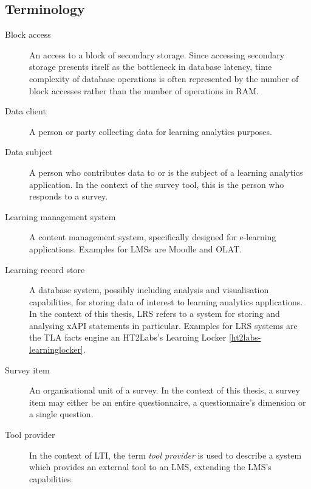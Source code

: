 \subsection{Terminology}
\begin{description}
	\item[Block access] 
		An access to a block of secondary storage. Since accessing secondary storage
		presents itself as the bottleneck in database latency, time complexity of
		database operations is often represented by the number of block accesses rather
		than the number of operations in RAM.
    \item[Data client]
    	A person or party collecting data for learning analytics purposes.
    \item[Data subject]
    	A person who contributes data to or is the subject of a learning analytics 
    	application. In the context of the survey tool, this is the person who
    	responds to a survey.
    \item[Learning management system]
	    A content management system, specifically designed for e-learning applications.
	    Examples for LMSs are Moodle and OLAT.
    \item[Learning record store]
    	A database system, possibly including analysis and visualisation capabilities, 
	    for storing data of interest to learning analytics applications.
	    In the context of this thesis, LRS refers to a system for storing and analysing xAPI statements in particular.
    	Examples for LRS systems are the TLA facts engine an HT2Labs's Learning Locker \ref{ht2labs-learninglocker}.
    \item[Survey item]
    	An organisational unit of a survey. In the context of this thesis,
    	a survey item may either be an entire questionnaire, a questionnaire's
    	dimension or a single question. 
    \item[Tool provider]
	    In the context of LTI, the term \textit{tool provider} is used to describe a
	    system which provides an external tool to an LMS, extending the LMS's capabilities.
\end{description}